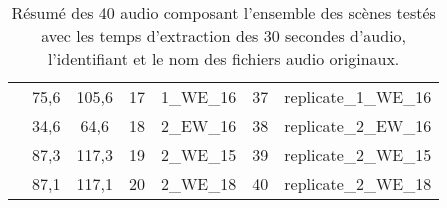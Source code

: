 \begin{table}[ht]
\begin{tabular}{|p{2cm}|c|c||c|c||c|c|}
                                  & 75,6 & 105,6 & 17 & 1\_WE\_16 & 37 & replicate\_1\_WE\_16 \\
                                  & 34,6 & 64,6 & 18 & 2\_EW\_16 & 38 & replicate\_2\_EW\_16 \\
                                  & 87,3 & 117,3 & 19 & 2\_WE\_15 & 39 & replicate\_2\_WE\_15 \\
                                  & 87,1 & 117,1 & 20 & 2\_WE\_18 & 40 & replicate\_2\_WE\_18\\
\bottomrule
\end{tabular}
\caption{Résumé des 40 audio composant l'ensemble des scènes testés avec les temps d'extraction des 30 secondes d'audio, l'identifiant et le nom des fichiers audio originaux.}
\label{tab:resume_scene_test}
\end{table}